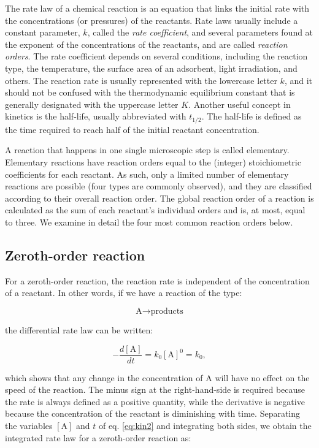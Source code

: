 \documentclass[
  9pt,
]{extbook}
\theoremstyle{definition}
\theoremstyle{definition}
\theoremstyle{definition}
\theoremstyle{remark}
\begin{document}
The rate law of a chemical reaction is an equation that links the initial rate with the concentrations (or pressures) of the reactants. Rate laws usually include a constant parameter, \(k\), called the \emph{rate coefficient}, and several parameters found at the exponent of the concentrations of the reactants, and are called \emph{reaction orders}. The rate coefficient depends on several conditions, including the reaction type, the temperature, the surface area of an adsorbent, light irradiation, and others. The reaction rate is usually represented with the lowercase letter \(k\), and it should not be confused with the thermodynamic equilibrium constant that is generally designated with the uppercase letter \(K\). Another useful concept in kinetics is the half-life, usually abbreviated with \(t_{1/2}\). The half-life is defined as the time required to reach half of the initial reactant concentration.

A reaction that happens in one single microscopic step is called elementary. Elementary reactions have reaction orders equal to the (integer) stoichiometric coefficients for each reactant. As such, only a limited number of elementary reactions are possible (four types are commonly observed), and they are classified according to their overall reaction order. The global reaction order of a reaction is calculated as the sum of each reactant's individual orders and is, at most, equal to three. We examine in detail the four most common reaction orders below.

\hypertarget{zeroth-order-reaction}{%
\subsection{Zeroth-order reaction}\label{zeroth-order-reaction}}

For a zeroth-order reaction, the reaction rate is independent of the concentration of a reactant. In other words, if we have a reaction of the type:

\begin{equation}
\text{A}\longrightarrow\text{products}
\end{equation}

the differential rate law can be written:

\begin{equation}
- \frac{d[\mathrm{A}]}{dt}=k_0 [\mathrm{A}]^0 = k_0,
\label{eq:kin2}
\end{equation}

which shows that any change in the concentration of \(\mathrm{A}\) will have no effect on the speed of the reaction. The minus sign at the right-hand-side is required because the rate is always defined as a positive quantity, while the derivative is negative because the concentration of the reactant is diminishing with time.
Separating the variables \([\mathrm{A}]\) and \(t\) of eq. \eqref{eq:kin2} and integrating both sides, we obtain the integrated rate law for a zeroth-order reaction as:
\end{document}
